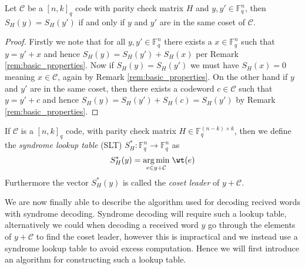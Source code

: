 \begin{lemma}\label{lem:syndrome_is_the_same_iff_they_are_in_the_same_coset}
  Let $\mathcal{C}$ be a $[n, k]_{q}$ code with parity check matrix $H$ and $y, y' \in \mathbb{F}_q^{n}$, then $S_H(y)=S_H(y')$ if and only if $y$ and $y'$ are in the same coset of $\mathcal{C}$.
\end{lemma}

\begin{proof}
  Firstly we note that for all $y, y' \in \mathbb{F}_q^n$ there exists a $x \in \mathbb{F}_q^n$ such that $y = y' + x$ and hence $S_H(y) = S_H(y') + S_H(x)$ per Remark \ref{rem:basic_properties}. Now if $S_H(y) = S_H(y')$ we must have $S_H(x) = 0$ meaning $x \in \mathcal{C}$, again by Remark \ref{rem:basic_properties}. On the other hand if $y$ and $y'$ are in the same coset, then there exists a codeword $c \in \mathcal{C}$ such that $y = y' + c$ and hence $S_H(y) = S_H(y') + S_H(c) = S_H(y')$ by Remark \ref{rem:basic_properties}.
\end{proof}

\begin{definition}\label{def:syndrome_lookup_table}
  If $\mathcal{C}$ is a $[n, k]_q$ code, with parity check matrix $H \in \mathbb{F}_q^{(n - k) \times k}$, then we define the \textit{syndrome lookup table} (SLT) $S^{*}_H: \mathbb{F}_q^n \to \mathbb{F}_q^n$ as
  \begin{equation*}
    S_{H}^{*}(y) = \underset{e \in y + \mathcal{C}}{\arg \min} \; \wt(e)
  \end{equation*}
  Furthermore the vector $S_H^{*}(y)$ is called the \textit{coset leader} of $y + \mathcal{C}$.
\end{definition}

We are now finally able to describe the algorithm used for decoding recived words with syndrome decoding. Syndrome decoding will require such a lookup table, alternatively we could when decoding a received word $y$ go through the elements of $y + \mathcal{C}$ to find the coset leader, however this is impractical and we instead use a syndrome lookup table to avoid excess computation. Hence we will first introduce an algorithm for constructing such a lookup table.

